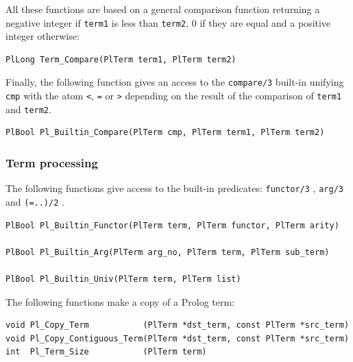 All these functions are based on a general comparison function returning a
negative integer if \texttt{term1} is less than \texttt{term2}, 0 if they
are equal and a positive integer otherwise:

\begin{Code}
\begin{verbatim}
PlLong Term_Compare(PlTerm term1, PlTerm term2)
\end{verbatim}
\end{Code}

Finally, the following function gives an access to the \texttt{compare/3}
built-in  unifying \texttt{cmp} with the
atom \texttt{<}, \texttt{=} or \texttt{>} depending on the result of
the comparison of \texttt{term1} and \texttt{term2}.

\begin{Code}
\begin{verbatim}
PlBool Pl_Builtin_Compare(PlTerm cmp, PlTerm term1, PlTerm term2)
\end{verbatim}
\end{Code}


\subsubsection{Term processing}

The following functions give access to the built-in predicates:
\texttt{functor/3} , \texttt{arg/3} 
and \texttt{(=..)/2} .


\begin{Code}
\begin{verbatim}
PlBool Pl_Builtin_Functor(PlTerm term, PlTerm functor, PlTerm arity)

PlBool Pl_Builtin_Arg(PlTerm arg_no, PlTerm term, PlTerm sub_term)

PlBool Pl_Builtin_Univ(PlTerm term, PlTerm list)
\end{verbatim}
\end{Code}

The following functions make a copy of a Prolog term:

\begin{Code}
\begin{verbatim}
void Pl_Copy_Term           (PlTerm *dst_term, const PlTerm *src_term)
void Pl_Copy_Contiguous_Term(PlTerm *dst_term, const PlTerm *src_term)
int  Pl_Term_Size           (PlTerm term)
\end{verbatim}
\end{Code}

